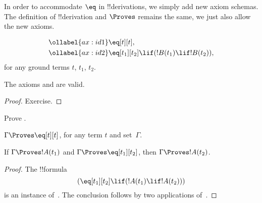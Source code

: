 \documentclass[../../include/open-logic-section]{subfiles}
\begin{document}


In order to accommodate $\eq$ in !!{derivation}s, we simply add new
axiom schemas. The definition of !!{derivation} and $\Proves$ remains
the same, we just also allow the new axioms.

\begin{defn}
\begin{align}
\ollabel{ax:id1} & \eq[t][t], \\
\ollabel{ax:id2} & \eq[t_1][t_2] \lif (!B(t_1) \lif
  !B(t_2)),
\end{align}
for any ground terms $t$, $t_1$, $t_2$.
\end{defn}

\begin{prop}
  The axioms  and  are valid.
\end{prop}

\begin{proof}
  Exercise.
\end{proof}

\begin{prob}
Prove .
\end{prob}

\begin{prop}
 $\Gamma \Proves \eq[t][t]$, for any term $t$ and set~$\Gamma$.
\end{prop}

\begin{prop}
  If $\Gamma \Proves !A(t_1)$ and $\Gamma \Proves
  \eq[t_1][t_2]$, then $\Gamma \Proves !A(t_2)$.
\end{prop}

\begin{proof}
The !!{formula}
\[
(\eq[t_1][t_2] \lif (!A(t_1) \lif !A(t_2)))
\]
is an instance of~. The conclusion follows by two applications
of~\MP.
\end{proof}
\end{document}
